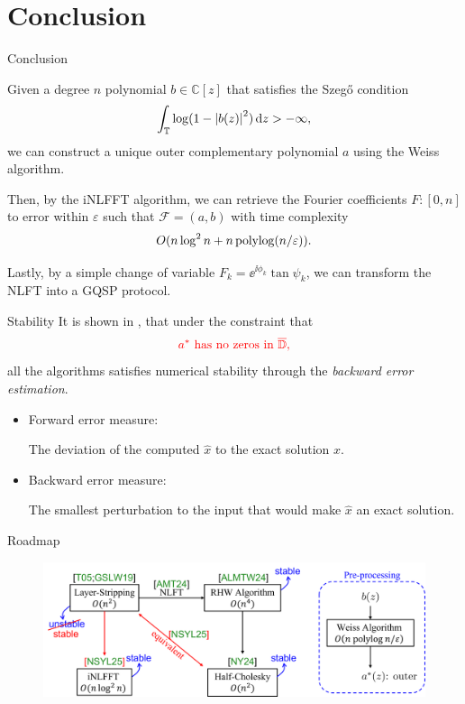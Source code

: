 \section{Conclusion}

\begin{frame}{Conclusion}
    \begin{theorem}
        Given a degree $n$ polynomial $b\in\mathbb{C}[z]$ that satisfies the Szeg\H{o} condition
        \begin{equation}
            \int_{\mathbb{T}}\log(1-\left|{b(z)}\right|^2)\,\mathrm{d} z > -\infty,
        \end{equation}
        we can construct a unique outer complementary polynomial $a$ using the Weiss algorithm. 
        
        Then, by the iNLFFT algorithm, we can retrieve the Fourier coefficients $F:[0,n]$ to error within $\varepsilon$ such that $\mathcal{F} = (a,b)$ with time complexity \begin{equation*}
            O(n\log^2n + n\operatorname{\mathrm{polylog}}(n/\varepsilon)).
        \end{equation*}

        Lastly, by a simple change of variable $F_k=\ee^{\ii\phi_k}\tan\psi_k$, we can transform the NLFT into a GQSP protocol.
    \end{theorem}
\end{frame}
\begin{frame}{Stability}
    It is shown in \cite{Lin2025}, that under the constraint that
    \begin{equation}
        \color{red} a^* \text{ has no zeros in }\overline{\mathbb{D}},
    \end{equation}
    all the algorithms satisfies numerical stability through the \textit{backward error estimation}.

    \begin{itemize}
        \item Forward error measure:
        
        The deviation of the computed $\hat{x}$ to the exact solution $x$.
        
        \item Backward error measure:
        
        The smallest perturbation to the input that would make $\hat{x}$ an exact solution.
    \end{itemize}
\end{frame}
\begin{frame}{Roadmap}
    \begin{figure}
        \centering
        \includegraphics[width=1\linewidth]{figures/roadmap.png}
    \end{figure}
\end{frame}
